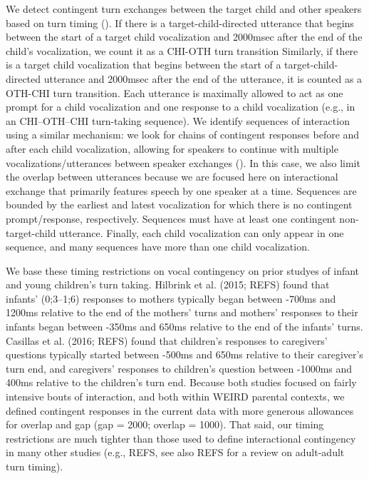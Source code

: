 \documentclass[floatsintext,man]{apa6}
\theoremstyle{definition}
\theoremstyle{definition}
\theoremstyle{definition}
\theoremstyle{remark}
\begin{document}
We detect contingent turn exchanges between the target child and other
speakers based on turn timing (). If there is a target-child-directed
utterance that begins between the start of a target child vocalization
and 2000msec after the end of the child's vocalization, we count it as a
CHI-OTH turn transition Similarly, if there is a target child
vocalization that begins between the start of a target-child-directed
utterance and 2000msec after the end of the utterance, it is counted as
a OTH-CHI turn transition. Each utterance is maximally allowed to act as
one prompt for a child vocalization and one response to a child
vocalization (e.g., in an CHI--OTH--CHI turn-taking sequence). We
identify sequences of interaction using a similar mechanism: we look for
chains of contingent responses before and after each child vocalization,
allowing for speakers to continue with multiple vocalizations/utterances
between speaker exchanges (). In this case, we also limit the overlap
between utterances because we are focused here on interactional exchange
that primarily features speech by one speaker at a time. Sequences are
bounded by the earliest and latest vocalization for which there is no
contingent prompt/response, respectively. Sequences must have at least
one contingent non-target-child utterance. Finally, each child
vocalization can only appear in one sequence, and many sequences have
more than one child vocalization.

We base these timing restrictions on vocal contingency on prior studyes
of infant and young children's turn taking. Hilbrink et al. (2015; REFS)
found that infants' (0;3--1;6) responses to mothers typically began
between -700ms and 1200ms relative to the end of the mothers' turns and
mothers' responses to their infants began between -350ms and 650ms
relative to the end of the infants' turns. Casillas et al. (2016; REFS)
found that children's responses to caregivers' questions typically
started between -500ms and 650ms relative to their caregiver's turn end,
and caregivers' responses to children's question between -1000ms and
400ms relative to the children's turn end. Because both studies focused
on fairly intensive bouts of interaction, and both within WEIRD parental
contexts, we defined contingent responses in the current data with more
generous allowances for overlap and gap (gap = 2000; overlap = 1000).
That said, our timing restrictions are much tighter than those used to
define interactional contingency in many other studies (e.g., REFS, see
also REFS for a review on adult-adult turn timing).
\end{document}
